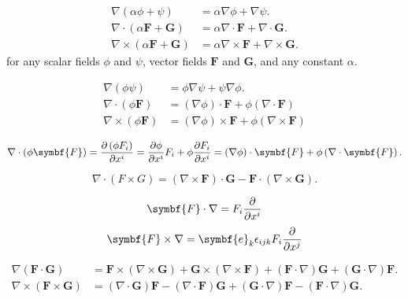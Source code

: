 \begin{align*}
	\nabla\left(\alpha\phi+\psi\right)                 & =
	\alpha\nabla\phi+\nabla\psi.                           \\
	\nabla\cdot\left(\alpha\symbf{F}+\symbf{G}\right)  & =
	\alpha\nabla\cdot\symbf{F}+\nabla\cdot\symbf{G}.       \\
	\nabla\times\left(\alpha\symbf{F}+\symbf{G}\right) & =
	\alpha\nabla\times\symbf{F}+\nabla\times\symbf{G}.
\end{align*}
for any scalar fields $\phi$ and $\psi$, vector fields $\symbf{F}$ and $\symbf{G}$,
and any constant $\alpha$.

\begin{align*}
	\nabla\left(\phi\psi\right)            & =
	\phi\nabla\psi+\psi\nabla\phi.                                              \\
	\nabla\cdot\left(\phi\symbf{F}\right)  & =
	\left(\nabla\phi\right)\cdot\symbf{F}+\phi\left(\nabla\cdot\symbf{F}\right) \\
	\nabla\times\left(\phi\symbf{F}\right) & =
	\left(\nabla\phi\right)\times\symbf{F}+\phi\left(\nabla\times\symbf{F}\right)
\end{align*}

\begin{equation*}
	\nabla\cdot\left(\phi\symbf{F}\right)=
	\diffp{\left(\phi F_{i}\right)}{x^{i}}=
	\diffp{\phi}{x^{i}}F_{i}+
	\phi\diffp{F_{i}}{x^{i}}=
	\left(\nabla\phi\right)\cdot\symbf{F}+
	\phi\left(\nabla\cdot\symbf{F}\right).
\end{equation*}

\begin{equation*}
	\nabla\cdot\left(F\times G\right)=
	\left(\nabla\times\symbf{F}\right)\cdot\symbf{G}-
	\symbf{F}\cdot\left(\nabla\times\symbf{G}\right).
\end{equation*}

\begin{equation*}
	\symbf{F}\cdot\nabla=F_{i}\diffp{}{x^{i}}
\end{equation*}
\begin{equation*}
	\symbf{F}\times\nabla=
	\symbf{e}_{k}
	\epsilon_{ijk}
	F_{i}\diffp{}{x^{j}}
\end{equation*}

\begin{align*}
	\nabla\left(\symbf{F}\cdot\symbf{G}\right)        & =
	\symbf{F}\times\left(\nabla\times\symbf{G}\right)+
	\symbf{G}\times\left(\nabla\times\symbf{F}\right)+
	\left(\symbf{F}\cdot\nabla\right)\symbf{G}+
	\left(\symbf{G}\cdot\nabla\right)\symbf{F}.           \\
	\nabla\times\left(\symbf{F}\times\symbf{G}\right) & =
	\left(\nabla\cdot\symbf{G}\right)\symbf{F}-
	\left(\nabla\cdot\symbf{F}\right)\symbf{G}+
	\left(\symbf{G}\cdot\nabla\right)\symbf{F}-
	\left(\symbf{F}\cdot\nabla\right)\symbf{G}.
\end{align*}

